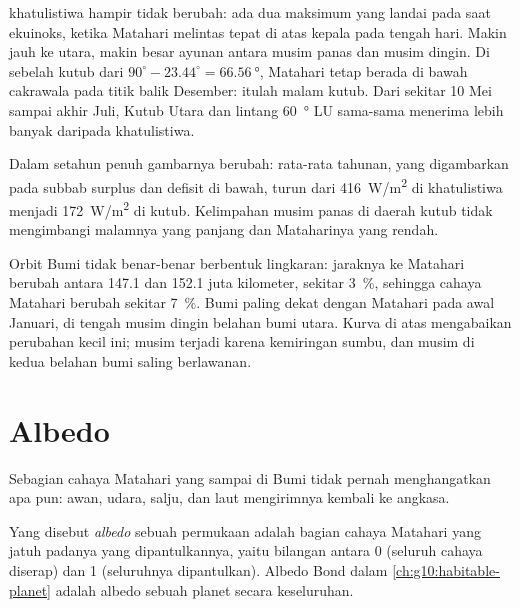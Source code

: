 \begin{remark}\label{rem:g10:earth-energy-budget:curves}
 khatulistiwa hampir tidak berubah: ada dua maksimum yang landai pada
saat ekuinoks, ketika Matahari melintas tepat di atas kepala pada tengah hari.
Makin jauh ke utara, makin besar ayunan antara musim panas dan musim dingin.
Di sebelah kutub dari $90^\circ - 23.44^\circ = \qty{66.56}{\degree}$,
Matahari tetap berada di bawah cakrawala pada titik balik Desember: itulah
malam kutub. Dari sekitar 10 Mei sampai akhir Juli, Kutub Utara dan lintang
\qty{60}{\degree} LU sama-sama menerima lebih banyak daripada khatulistiwa.
\end{remark}

Dalam setahun penuh gambarnya berubah:  rata-rata tahunan, yang
digambarkan pada subbab surplus dan defisit di bawah, turun dari \qty{416}{W/m^2} di khatulistiwa menjadi \qty{172}{W/m^2} di
kutub. Kelimpahan musim panas di daerah kutub tidak mengimbangi malamnya yang
panjang dan Mataharinya yang rendah.

\begin{remark}\label{rem:g10:earth-energy-budget:distance}
Orbit Bumi tidak benar-benar berbentuk lingkaran: jaraknya ke Matahari berubah
antara \num{147.1} dan \num{152.1} juta kilometer, sekitar
\qty{3}{\percent}, sehingga cahaya Matahari berubah sekitar \qty{7}{\percent}.
Bumi paling dekat dengan Matahari pada awal Januari, di tengah musim dingin
belahan bumi utara. Kurva di atas mengabaikan perubahan kecil ini; musim
terjadi karena kemiringan sumbu, dan musim di kedua belahan bumi saling
berlawanan.
\end{remark}

\section{Albedo}

Sebagian cahaya Matahari yang sampai di Bumi tidak pernah menghangatkan apa
pun: awan, udara, salju, dan laut mengirimnya kembali ke angkasa.

\begin{definition}[Albedo]\label{def:g10:earth-energy-budget:albedo}
Yang disebut \emph{albedo} sebuah permukaan adalah bagian cahaya
Matahari yang jatuh padanya yang dipantulkannya, yaitu bilangan antara 0
(seluruh cahaya diserap) dan 1 (seluruhnya dipantulkan). Albedo Bond dalam
\cref{ch:g10:habitable-planet} adalah albedo sebuah planet secara keseluruhan.
\end{definition}

